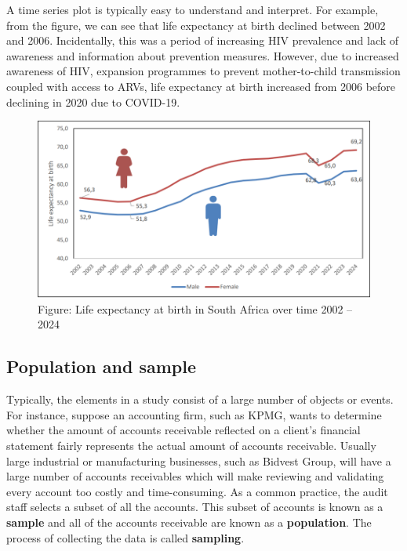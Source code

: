 \documentclass[
]{book}
\begin{document}
A time series plot is typically easy to understand and interpret. For example, from the figure, we can see that life expectancy at birth declined between 2002 and 2006. Incidentally, this was a period of increasing HIV prevalence and lack of awareness and information about prevention measures. However, due to increased awareness of HIV, expansion programmes to prevent mother-to-child transmission coupled with access to ARVs, life expectancy at birth increased from 2006 before declining in 2020 due to COVID-19.~

\begin{figure}
\centering
\includegraphics[width=5.20833in,height=\textheight]{images/clipboard-2840066963.png}
\caption{Figure: Life expectancy at birth in South Africa over time 2002 -- 2024}
\end{figure}

\subsection{Population and sample}\label{population-and-sample}

Typically, the elements in a study consist of a large number of objects or events. For instance, suppose an accounting firm, such as KPMG, wants to determine whether the amount of accounts receivable reflected on a client's financial statement fairly represents the actual amount of accounts receivable. Usually large industrial or manufacturing businesses, such as Bidvest Group, will have a large number of accounts receivables which will make reviewing and validating every account too costly and time-consuming. As a common practice, the audit staff selects a subset of all the accounts. This subset of accounts is known as a \textbf{sample} and all of the accounts receivable are known as a \textbf{population}. The process of collecting the data is called \textbf{sampling}.
\end{document}
